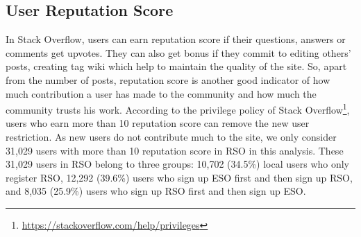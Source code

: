 
\subsection{User Reputation Score}

In Stack Overflow, users can earn reputation score if their questions, answers or comments get upvotes. 
They can also get bonus if they commit to editing others' posts, creating tag wiki which help to maintain the quality of the site.
So, apart from the number of posts, reputation score is another good indicator of how much contribution a user has made to the community and how much the community trusts his work.
According to the privilege policy of Stack Overflow\footnote{\url{https://stackoverflow.com/help/privileges}}, users who earn more than 10 reputation score can remove the new user restriction. 
As new users do not contribute much to the site, we only consider 31,029 users with more than 10 reputation score in RSO in this analysis.
These 31,029 users in RSO belong to three groups:
10,702 (34.5\%) local users who only register RSO,
12,292 (39.6\%) users who sign up ESO first and then sign up RSO,
and 8,035 (25.9\%) users who sign up RSO first and then sign up ESO.

